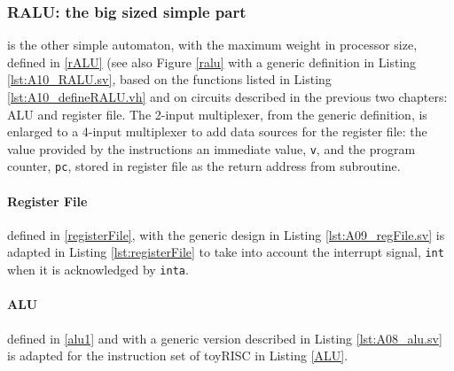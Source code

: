 
\subsubsection{RALU: the big sized simple part} is the other simple automaton, with the maximum weight in processor size, defined in \ref{rALU} (see also Figure \ref{ralu} with a generic definition in Listing \ref{lst:A10_RALU.sv}, based on the functions listed in Listing \ref{lst:A10_defineRALU.vh} and on circuits described in the previous two chapters: ALU and register file. The 2-input multiplexer, from  the generic definition, is enlarged to a 4-input multiplexer to add data sources for the register file: the value provided by the instructions an immediate value, {\tt v}, and the program counter, {\tt pc}, stored in register file as the return address from subroutine.


\paragraph{Register File} defined in \ref{registerFile}, with the generic design in Listing \ref{lst:A09_regFile.sv}  is adapted in Listing \ref{lst:registerFile} to take into account the interrupt signal, {\tt int} when it is acknowledged by {\tt inta}.


\paragraph{ALU} defined in \ref{alu1} and with a generic version described in Listing \ref{lst:A08_alu.sv} is adapted for the instruction set of toyRISC in Listing \ref{ALU}.

